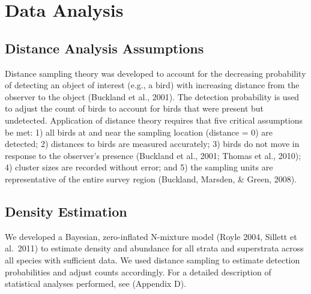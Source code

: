 \documentclass[
  letterpaper,
  DIV=11,
  numbers=noendperiod,
  oneside]{scrreprt}
\begin{document}
\hypertarget{data-analysis}{%
\section{Data Analysis}\label{data-analysis}}

\hypertarget{distance-analysis-assumptions}{%
\subsection{Distance Analysis
Assumptions}\label{distance-analysis-assumptions}}

Distance sampling theory was developed to account for the decreasing
probability of detecting an object of interest (e.g., a bird) with
increasing distance from the observer to the object (Buckland et al.,
2001). The detection probability is used to adjust the count of birds to
account for birds that were present but undetected. Application of
distance theory requires that five critical assumptions be met: 1) all
birds at and near the sampling location (distance = 0) are detected; 2)
distances to birds are measured accurately; 3) birds do not move in
response to the observer's presence (Buckland et al., 2001; Thomas et
al., 2010); 4) cluster sizes are recorded without error; and 5) the
sampling units are representative of the entire survey region (Buckland,
Marsden, \& Green, 2008).

\hypertarget{density-estimation}{%
\subsection{Density Estimation}\label{density-estimation}}

We developed a Bayesian, zero-inflated N-mixture model (Royle 2004,
Sillett et al.~2011) to estimate density and abundance for all strata
and superstrata across all species with sufficient data. We used
distance sampling to estimate detection probabilities and adjust counts
accordingly. For a detailed description of statistical analyses
performed, see (Appendix D).
\end{document}
